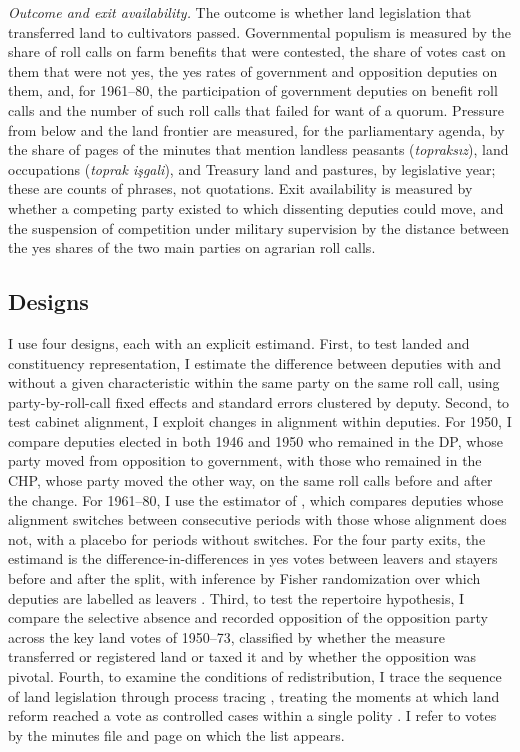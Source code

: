 \documentclass[12pt]{article}
\begin{document}
\textit{Outcome and exit availability.} The outcome is whether land legislation that transferred land to cultivators passed. Governmental populism is measured by the share of roll calls on farm benefits that were contested, the share of votes cast on them that were not yes, the yes rates of government and opposition deputies on them, and, for 1961--80, the participation of government deputies on benefit roll calls and the number of such roll calls that failed for want of a quorum. Pressure from below and the land frontier are measured, for the parliamentary agenda, by the share of pages of the minutes that mention landless peasants (\textit{topraksız}), land occupations (\textit{toprak işgali}), and Treasury land and pastures, by legislative year; these are counts of phrases, not quotations. Exit availability is measured by whether a competing party existed to which dissenting deputies could move, and the suspension of competition under military supervision by the distance between the yes shares of the two main parties on agrarian roll calls.

\subsection*{Designs}

I use four designs, each with an explicit estimand. First, to test landed and constituency representation, I estimate the difference between deputies with and without a given characteristic within the same party on the same roll call, using party-by-roll-call fixed effects and standard errors clustered by deputy. Second, to test cabinet alignment, I exploit changes in alignment within deputies. For 1950, I compare deputies elected in both 1946 and 1950 who remained in the DP, whose party moved from opposition to government, with those who remained in the CHP, whose party moved the other way, on the same roll calls before and after the change. For 1961--80, I use the estimator of \citet{dechaisemartin2020}, which compares deputies whose alignment switches between consecutive periods with those whose alignment does not, with a placebo for periods without switches. For the four party exits, the estimand is the difference-in-differences in yes votes between leavers and stayers before and after the split, with inference by Fisher randomization over which deputies are labelled as leavers \citep{imbens2015}. Third, to test the repertoire hypothesis, I compare the selective absence and recorded opposition of the opposition party across the key land votes of 1950--73, classified by whether the measure transferred or registered land or taxed it and by whether the opposition was pivotal. Fourth, to examine the conditions of redistribution, I trace the sequence of land legislation through process tracing \citep{collier2011}, treating the moments at which land reform reached a vote as controlled cases within a single polity \citep{slater2013}. I refer to votes by the minutes file and page on which the list appears.
\end{document}
